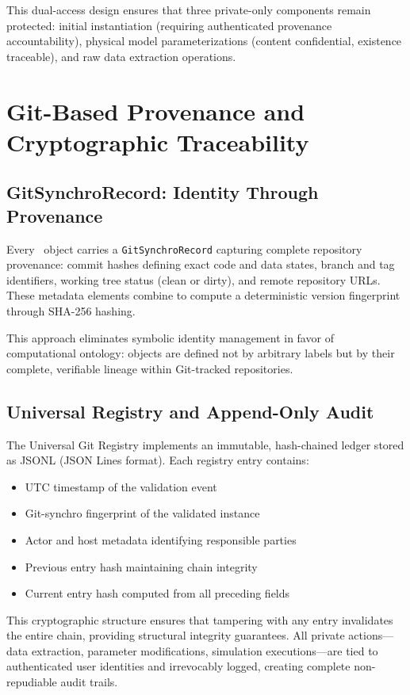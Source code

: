 This dual-access design ensures that three private-only components remain protected: initial instantiation (requiring authenticated provenance accountability), physical model parameterizations (content confidential, existence traceable), and raw data extraction operations.

\section{Git-Based Provenance and Cryptographic Traceability}

\subsection{GitSynchroRecord: Identity Through Provenance}

Every \hydrot\ object carries a \texttt{GitSynchroRecord} capturing complete repository provenance: commit hashes defining exact code and data states, branch and tag identifiers, working tree status (clean or dirty), and remote repository URLs. These metadata elements combine to compute a deterministic version fingerprint through SHA-256 hashing.

This approach eliminates symbolic identity management in favor of computational ontology: objects are defined not by arbitrary labels but by their complete, verifiable lineage within Git-tracked repositories.

\subsection{Universal Registry and Append-Only Audit}

The Universal Git Registry implements an immutable, hash-chained ledger stored as JSONL (JSON Lines format). Each registry entry contains:
\begin{itemize}
\item UTC timestamp of the validation event
\item Git-synchro fingerprint of the validated instance
\item Actor and host metadata identifying responsible parties
\item Previous entry hash maintaining chain integrity
\item Current entry hash computed from all preceding fields
\end{itemize}

This cryptographic structure ensures that tampering with any entry invalidates the entire chain, providing structural integrity guarantees. All private actions---data extraction, parameter modifications, simulation executions---are tied to authenticated user identities and irrevocably logged, creating complete non-repudiable audit trails.

